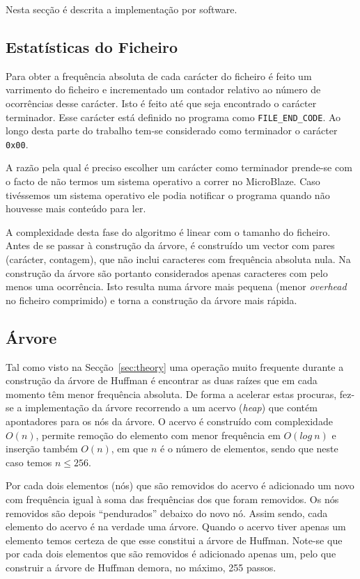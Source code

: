 \documentclass[a4paper]{article}
\begin{document}
	Nesta secção é descrita a implementação por software.

	\subsection{Estatísticas do Ficheiro}
	
	Para obter a frequência absoluta de cada carácter do ficheiro é feito um varrimento do ficheiro e incrementado um contador relativo ao número de ocorrências desse carácter. Isto é feito até que seja encontrado o carácter terminador. Esse carácter está definido no programa como \texttt{FILE\_END\_CODE}. Ao longo desta parte do trabalho tem-se considerado como terminador o carácter \texttt{0x00}.
	
	A razão pela qual é preciso escolher um carácter como terminador prende-se com o facto de não termos um sistema operativo a correr no MicroBlaze. Caso tivéssemos um sistema operativo ele podia notificar o programa quando não houvesse mais conteúdo para ler.
	
	A complexidade desta fase do algoritmo é linear com o tamanho do ficheiro. Antes de se passar à construção da árvore, é construído um vector com pares (carácter, contagem), que não inclui caracteres com frequência absoluta nula. Na construção da árvore são portanto considerados apenas caracteres com pelo menos uma ocorrência. Isto resulta numa árvore mais pequena (menor \textit{overhead} no ficheiro comprimido) e torna a construção da árvore mais rápida.
	
	\subsection{Árvore}
	
	Tal como visto na Secção~\ref{sec:theory} uma operação muito frequente durante a construção da árvore de Huffman é encontrar as duas raízes que em cada momento têm menor frequência absoluta. De forma a acelerar estas procuras, fez-se a implementação da árvore recorrendo a um acervo (\textit{heap}) que contém apontadores para os nós da árvore. O acervo é construído com complexidade $O(n)$, permite remoção do elemento com menor frequência em $O(log\ n)$ e inserção também $O(n)$, em que $n$ é o número de elementos, sendo que neste caso temos $n \leq 256$.
	
	Por cada dois elementos (nós) que são removidos do acervo é adicionado um novo com frequência igual à soma das frequências dos que foram removidos. Os nós removidos são depois ``pendurados'' debaixo do novo nó. Assim sendo, cada elemento do acervo é na verdade uma árvore. Quando o acervo tiver apenas um elemento temos certeza de que esse constitui a árvore de Huffman. Note-se que por cada dois elementos que são removidos é adicionado apenas um, pelo que construir a árvore de Huffman demora, no máximo, 255 passos.
		
\end{document}
